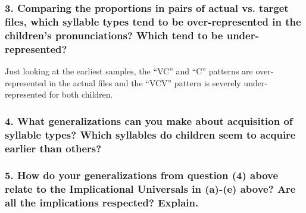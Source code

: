 \documentclass[a4paper,10pt]{article}
\begin{document}
  \subsubsection*{3. Comparing the proportions in pairs of actual vs. target files, which syllable types tend to be over-represented in the children’s pronunciations? Which tend to be under-represented?}
  Just looking at the earliest samples, the ``VC'' and ``C'' patterns are over-represented in the actual files and the ``VCV'' pattern is severely under-represented for both children.

  \subsubsection*{4. What generalizations can you make about acquisition of syllable types? Which syllables do
children seem to acquire earlier than others?}
  

  \subsubsection*{5. How do your generalizations from question (4) above relate to the Implicational Universals in (a)-(e) above? Are all the implications respected? Explain.}
  
\end{document}
